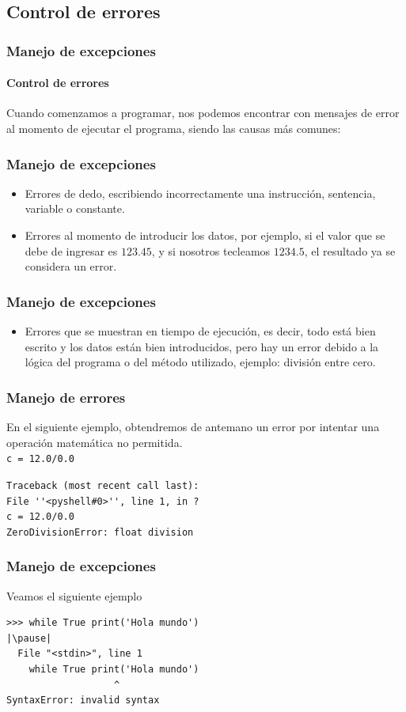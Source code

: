 \subsection{Control de errores}
\begin{frame}[fragile]
\frametitle{Manejo de excepciones}
\framesubtitle{Control de errores}
Cuando comenzamos a programar, nos podemos encontrar con mensajes de error al momento de ejecutar el programa, siendo las causas más comunes:
\end{frame}
\begin{frame}
\frametitle{Manejo de excepciones}
\begin{itemize}[<+->]
\item Errores de dedo, escribiendo incorrectamente una instrucción, sentencia, variable o constante.
\item Errores al momento de introducir los datos, por ejemplo, si el valor que se debe de ingresar es $123.45$, y si nosotros tecleamos $1234.5$, el resultado ya se considera un error.
\end{itemize}
\end{frame}
\begin{frame}
\frametitle{Manejo de excepciones}
\begin{itemize}[<+->]
\item Errores que se muestran en tiempo de ejecución, es decir, todo está bien escrito y los datos están bien introducidos, pero hay un error debido a la lógica del programa o del método utilizado, ejemplo: división entre cero.
\end{itemize}
\end{frame}
\begin{frame}[fragile]
\frametitle{Manejo de errores}
En el siguiente ejemplo, obtendremos de antemano un error por intentar una operación matemática no permitida.
\\
\bigskip
\verb|c = 12.0/0.0| \\
\pause
\begin{exampleblock}{}
\verb|Traceback (most recent call last):| \\
\verb|File ''<pyshell#0>'', line 1, in ?| \\
\verb|c = 12.0/0.0| \\
\verb|ZeroDivisionError: float division|
\end{exampleblock}
\end{frame}
\begin{frame}[fragile]
\frametitle{Manejo de excepciones}
Veamos el siguiente ejemplo
\begin{lstlisting}[basicstyle=\linespread{1.2}\ttfamily\small, columns=fullflexible,escapeinside=||]
>>> while True print('Hola mundo')
|\pause|
  File "<stdin>", line 1
    while True print('Hola mundo')
                   ^
SyntaxError: invalid syntax
\end{lstlisting}
\end{frame}
